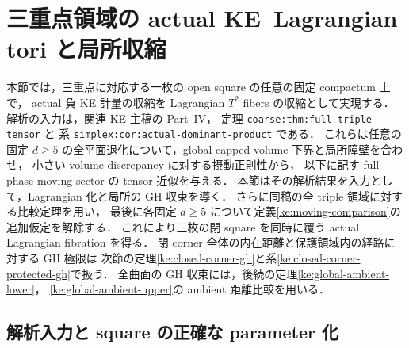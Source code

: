 \section{三重点領域の actual KE--Lagrangian tori と局所収縮}
\label{ke:open-cell-section}

本節では，三重点に対応する一枚の open square の任意の固定 compactum 上で，
actual 負 KE 計量の収縮を Lagrangian $T^2$ fibers の収縮として実現する．
解析の入力は，関連 KE 主稿\cite{KELocalCurrent}の Part~IV，
定理 \texttt{coarse:thm:full-triple-tensor} と
系 \texttt{simplex:cor:actual-dominant-product} である．
これらは任意の固定 $d\ge5$ の全平面退化について，global capped volume 下界と局所障壁を合わせ，
小さい volume discrepancy に対する摂動正則性から，
以下に記す full-phase moving sector の tensor 近似を与える．
本節はその解析結果を入力として，Lagrangian 化と局所の GH 収束を導く．
さらに同稿の全 triple 領域に対する比較定理を用い，
最後に各固定 $d\ge5$ について定義\ref{ke:moving-comparison}の追加仮定を解除する．
これにより三枚の閉 square を同時に覆う actual Lagrangian fibration を得る．
閉 corner 全体の内在距離と保護領域内の経路に対する GH 極限は
次節の定理\ref{ke:closed-corner-gh}と系\ref{ke:closed-corner-protected-gh}で扱う．
全曲面の GH 収束には，後続の定理\ref{ke:global-ambient-lower}，
\ref{ke:global-ambient-upper}の ambient 距離比較を用いる．

\subsection{解析入力と square の正確な parameter 化}

